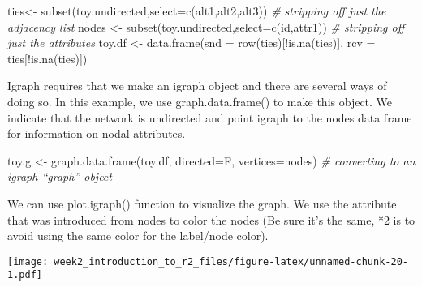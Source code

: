 \documentclass[
]{article}
\newenvironment{Shaded}{\begin{snugshade}}{\end{snugshade}}
\newcommand{\AttributeTok}[1]{\textcolor[rgb]{0.77,0.63,0.00}{#1}}
\newcommand{\CommentTok}[1]{\textcolor[rgb]{0.56,0.35,0.01}{\textit{#1}}}
\newcommand{\DecValTok}[1]{\textcolor[rgb]{0.00,0.00,0.81}{#1}}
\newcommand{\FunctionTok}[1]{\textcolor[rgb]{0.00,0.00,0.00}{#1}}
\newcommand{\NormalTok}[1]{#1}
\newcommand{\OtherTok}[1]{\textcolor[rgb]{0.56,0.35,0.01}{#1}}
\newcommand{\SpecialCharTok}[1]{\textcolor[rgb]{0.00,0.00,0.00}{#1}}
\begin{document}
\begin{Shaded}
\begin{Highlighting}[]
\NormalTok{ties}\OtherTok{\textless{}{-}} \FunctionTok{subset}\NormalTok{(toy.undirected,}\AttributeTok{select=}\FunctionTok{c}\NormalTok{(alt1,alt2,alt3))  }\CommentTok{\# stripping off just the adjacency list}
\NormalTok{nodes }\OtherTok{\textless{}{-}} \FunctionTok{subset}\NormalTok{(toy.undirected,}\AttributeTok{select=}\FunctionTok{c}\NormalTok{(id,attr1))      }\CommentTok{\# stripping off just the attributes}
\NormalTok{toy.df }\OtherTok{\textless{}{-}} \FunctionTok{data.frame}\NormalTok{(}\AttributeTok{snd =} \FunctionTok{row}\NormalTok{(ties)[}\SpecialCharTok{!}\FunctionTok{is.na}\NormalTok{(ties)], }\AttributeTok{rcv =}\NormalTok{ ties[}\SpecialCharTok{!}\FunctionTok{is.na}\NormalTok{(ties)])   }
\end{Highlighting}
\end{Shaded}

Igraph requires that we make an igraph object and there are several ways
of doing so. In this example, we use graph.data.frame() to make this
object. We indicate that the network is undirected and point igraph to
the nodes data frame for information on nodal attributes.

\begin{Shaded}
\begin{Highlighting}[]
\NormalTok{toy.g }\OtherTok{\textless{}{-}} \FunctionTok{graph.data.frame}\NormalTok{(toy.df, }\AttributeTok{directed=}\NormalTok{F, }\AttributeTok{vertices=}\NormalTok{nodes)   }\CommentTok{\# converting to an igraph “graph” object}
\end{Highlighting}
\end{Shaded}

We can use plot.igraph() function to visualize the graph. We use the
attribute that was introduced from nodes to color the nodes (Be sure
it's the same, *2 is to avoid using the same color for the label/node
color).

\begin{Shaded}
\end{Shaded}

\texttt{[image: week2\_introduction\_to\_r2\_files/figure-latex/unnamed-chunk-20-1.pdf]}
\end{document}
